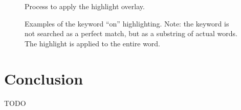 \documentclass[a4paper]{article}
\begin{document}
\begin{figure}[H]
	\caption{Process to apply the highlight overlay.}
	\label{fig:keywordhighliting}
\end{figure}

\begin{figure}[H]
	\caption{ Examples of the keyword “on” highlighting. Note: the keyword is not searched as a perfect match, but as a substring of actual words. The highlight is applied to the entire word.}
	\label{fig:keywordhighliting2}
\end{figure}

\section{Conclusion}

TODO
\end{document}

